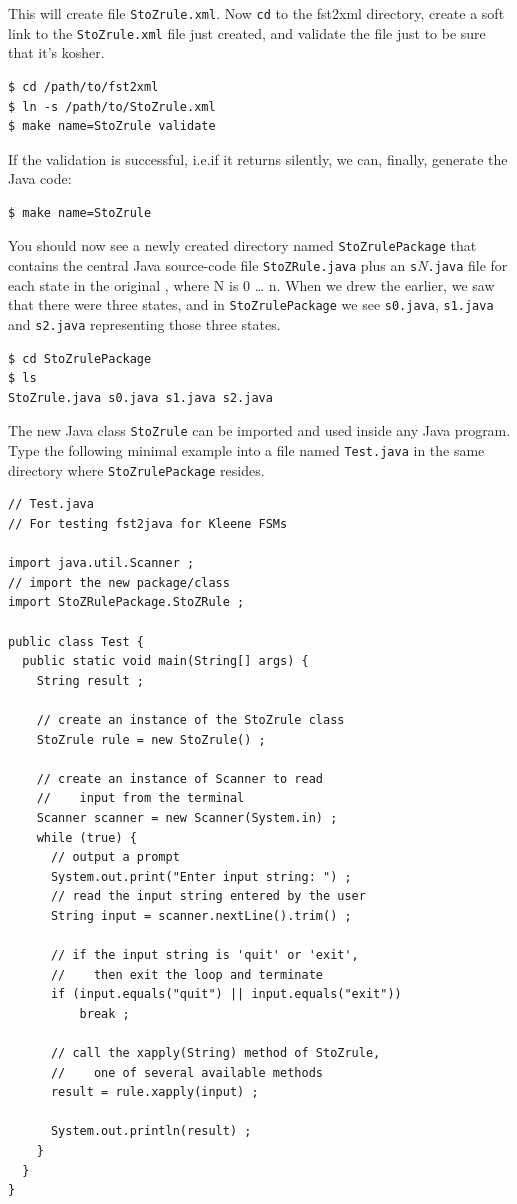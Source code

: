 \noindent
This will create file \texttt{StoZrule.xml}.  Now \texttt{cd} to the
fst2xml directory, create a soft link to the \texttt{StoZrule.xml}
file just created, and validate the file just to be sure that it's
kosher.

\begin{Verbatim}
$ cd /path/to/fst2xml
$ ln -s /path/to/StoZrule.xml
$ make name=StoZrule validate
\end{Verbatim}

If the validation is successful, i.e.\@ if it returns silently, 
we can, finally, generate the Java code:

\begin{Verbatim}
$ make name=StoZrule
\end{Verbatim}

\noindent
You should now see a newly created directory named \texttt{StoZrulePackage}
that contains the central Java source-code
file \texttt{StoZRule.java} plus an \texttt{s}\emph{N}\texttt{.java}
file for each state in the original \fsm{}, where N is 0 \ldots{} n.
When we drew the \fsm{} earlier, we saw that there were three states,
and in \texttt{StoZrulePackage} we see \texttt{s0.java},
\texttt{s1.java} and \texttt{s2.java} representing those three states.

\begin{Verbatim}
$ cd StoZrulePackage
$ ls
StoZrule.java s0.java s1.java s2.java
\end{Verbatim}

The new Java class \texttt{StoZrule} can be imported and used inside any Java
program.  Type the following minimal example into a file named
\texttt{Test.java} in the same directory where \texttt{StoZrulePackage} resides.

\begin{Verbatim}
// Test.java
// For testing fst2java for Kleene FSMs

import java.util.Scanner ;
// import the new package/class
import StoZRulePackage.StoZRule ; 

public class Test {
  public static void main(String[] args) {
    String result ;

    // create an instance of the StoZrule class
    StoZrule rule = new StoZrule() ;

    // create an instance of Scanner to read
    //    input from the terminal
    Scanner scanner = new Scanner(System.in) ;
    while (true) {
      // output a prompt
      System.out.print("Enter input string: ") ;
      // read the input string entered by the user
      String input = scanner.nextLine().trim() ;

      // if the input string is 'quit' or 'exit',
      //    then exit the loop and terminate
      if (input.equals("quit") || input.equals("exit"))
          break ;

      // call the xapply(String) method of StoZrule,
      //    one of several available methods
      result = rule.xapply(input) ;

      System.out.println(result) ;
    }
  }
}
\end{Verbatim}

